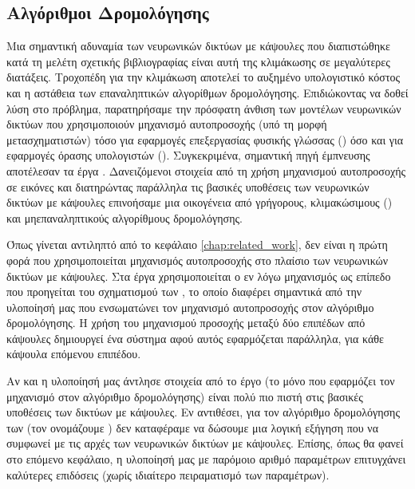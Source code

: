 \subsection{Αλγόριθμοι Δρομολόγησης}

Μια σημαντική αδυναμία των νευρωνικών δικτύων με κάψουλες που διαπιστώθηκε κατά τη μελέτη σχετικής βιβλιογραφίας είναι αυτή της κλιμάκωσης σε μεγαλύτερες διατάξεις. Τροχοπέδη για την κλιμάκωση αποτελεί το αυξημένο υπολογιστικό κόστος και η αστάθεια των επαναληπτικών αλγορίθμων δρομολόγησης. Επιδιώκοντας να δοθεί λύση στο πρόβλημα, παρατηρήσαμε την πρόσφατη άνθιση των μοντέλων νευρωνικών δικτύων που χρησιμοποιούν μηχανισμό αυτο\textendash προσοχής (υπό τη μορφή μετασχηματιστών) τόσο για εφαρμογές επεξεργασίας φυσικής γλώσσας () όσο και για εφαρμογές όρασης υπολογιστών (). Συγκεκριμένα,  σημαντική πηγή έμπνευσης αποτέλεσαν τα έργα \cite{dosovitskiy2020image_is_worth_16, carion2020end}. Δανειζόμενοι στοιχεία από τη χρήση μηχανισμού αυτο\textendash προσοχής σε εικόνες και διατηρώντας παράλληλα τις βασικές υποθέσεις των νευρωνικών δικτύων με κάψουλες επινοήσαμε μια οικογένεια από γρήγορους, κλιμακώσιμους () και μη\textendash επαναληπτικούς αλγορίθμους δρομολόγησης.\par

Όπως γίνεται αντιληπτό από το κεφάλαιο \ref{chap:related_work}, δεν είναι η πρώτη φορά που χρησιμοποιείται μηχανισμός αυτο\textendash προσοχής στο πλαίσιο των νευρωνικών δικτύων με κάψουλες. Στα έργα \cite{hoogi2019self, huang2020capsnet} χρησιμοποιείται ο εν λόγω μηχανισμός ως επίπεδο που προηγείται του σχηματισμού των , το οποίο διαφέρει σημαντικά από την υλοποίησή μας που ενσωματώνει τον μηχανισμό αυτο\textendash προσοχής στον αλγόριθμο δρομολόγησης. Η χρήση του μηχανισμού προσοχής μεταξύ δύο επιπέδων από κάψουλες δημιουργεί ένα σύστημα  αφού αυτός εφαρμόζεται παράλληλα, για κάθε κάψουλα επόμενου επιπέδου.\par

Αν και η υλοποίησή μας άντλησε στοιχεία από το έργο \cite{mazzia2021efficient} (το μόνο που εφαρμόζει τον μηχανισμό στον αλγόριθμο δρομολόγησης) είναι πολύ πιο πιστή στις βασικές υποθέσεις των δικτύων με κάψουλες. Εν αντιθέσει, για τον αλγόριθμο δρομολόγησης των  (τον ονομάζουμε ) δεν καταφέραμε να δώσουμε μια λογική εξήγηση που να συμφωνεί με τις αρχές των νευρωνικών δικτύων με κάψουλες. Επίσης, όπως θα φανεί στο επόμενο κεφάλαιο, η υλοποίησή μας με παρόμοιο αριθμό παραμέτρων επιτυγχάνει καλύτερες επιδόσεις (χωρίς ιδιαίτερο πειραματισμό των παραμέτρων).\par

